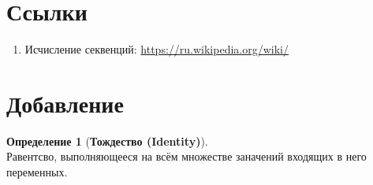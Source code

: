 \documentclass[fleqn,11pt]{article}
\theoremstyle{definition}
\newtheorem{definition}{Определение}
\begin{document}
\printbibliography

\section{Ссылки}
\begin{enumerate}
  \item Исчисление секвенций: {\href{https://ru.wikipedia.org/wiki/%D0%98%D1%81%D1%87%D0%B8%D1%81%D0%BB%D0%B5%D0%BD%D0%B8%D0%B5_%D1%81%D0%B5%D0%BA%D0%B2%D0%B5%D0%BD%D1%86%D0%B8%D0%B9}{https://ru.wikipedia.org/wiki/\textcyrillic{Исчисление{\_}секвенций}}}\label{url:sequent}
\end{enumerate}

\clearpage

\section{Добавление}

\begin{definition}[\textbf{Тождество (Identity)}] ~\\
	Равентсво, выполняющееся на всём множестве заначений входящих в него переменных.
\end{definition}
\end{document}
